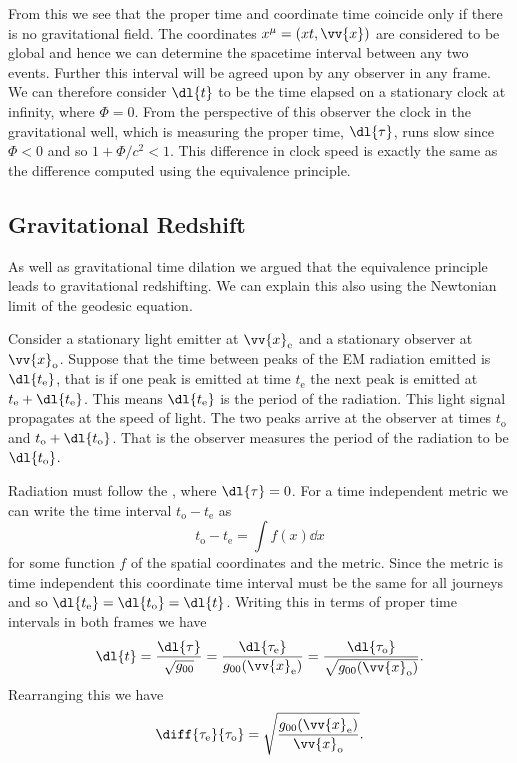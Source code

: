 \documentclass[fleqn]{NotesClass}
\begin{document}
    From this we see that the proper time and coordinate time coincide only if there is no gravitational field.
    The coordinates \(x^\mu = (xt, \vv{x})\) are considered to be global and hence we can determine the spacetime interval between any two events.
    Further this interval will be agreed upon by any observer in any frame.
    We can therefore consider \(\dl{t}\) to be the time elapsed on a stationary clock at infinity, where \(\Phi = 0\).
    From the perspective of this observer the clock in the gravitational well, which is measuring the proper time, \(\dl{\tau}\), runs slow since \(\Phi < 0\) and so \(1 + \Phi/c^2 < 1\).
    This difference in clock speed is exactly the same as the difference computed using the equivalence principle.
    
    \subsection{Gravitational Redshift}
    As well as gravitational time dilation we argued that the equivalence principle leads to gravitational redshifting.
    We can explain this also using the Newtonian limit of the geodesic equation.
    
    Consider a stationary light emitter at \(\vv{x}_{\mathrm{e}}\) and a stationary observer at \(\vv{x}_{\mathrm{o}}\).
    Suppose that the time between peaks of the EM radiation emitted is \(\dl{t_{\mathrm{e}}}\), that is if one peak is emitted at time \(t_{\mathrm{e}}\) the next peak is emitted at \(t_{\mathrm{e}} + \dl{t_{\mathrm{e}}}\).
    This means \(\dl{t_{\mathrm{e}}}\) is the period of the radiation.
    This light signal propagates at the speed of light.
    The two peaks arrive at the observer at times \(t_{\mathrm{o}}\) and \(t_{\mathrm{o}} + \dl{t_{\mathrm{o}}}\).
    That is the observer measures the period of the radiation to be \(\dl{t_{\mathrm{o}}}\).
    
    Radiation must follow the , where \(\dl{\tau} = 0\).
    For a time independent metric we can write the time interval \(t_{\mathrm{o}} - t_{\mathrm{e}}\) as
    \begin{equation}
        t_{\mathrm{o}} - t_{\mathrm{e}} = \int f(x) \dd{x}
    \end{equation}
    for some function \(f\) of the spatial coordinates and the metric.
    Since the metric is time independent this coordinate time interval must be the same for all journeys and so \(\dl{t_{\mathrm{e}}} = \dl{t_{\mathrm{o}}} = \dl{t}\).
    Writing this in terms of proper time intervals in both frames we have
    \begin{equation}
        \dl{t} = \frac{\dl{\tau}}{\sqrt{g_{00}}} = \frac{\dl{\tau_{\mathrm{e}}}}{g_{00}(\vv{x}_{\mathrm{e}})} = \frac{\dl{\tau_{\mathrm{o}}}}{\sqrt{g_{00}(\vv{x}_{\mathrm{o}})}}.
    \end{equation}
    Rearranging this we have
    \begin{equation}
        \diff{\tau_{\mathrm{e}}}{\tau_{\mathrm{o}}} = \sqrt{\frac{g_{00}(\vv{x}_{\mathrm{e}})}{\vv{x}_{\mathrm{o}}}}.
    \end{equation}
    
\end{document}
